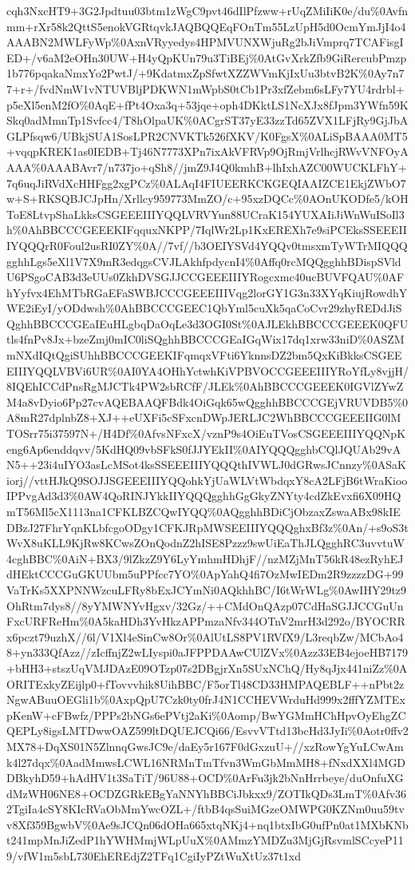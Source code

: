 \documentclass[]{article}
\begin{document}
cqh3NxcHT9+3G2Jpdtuu03btm1zWgC9pvt46dIlPfzww+rUqZMiIiK0e/du\%0Avfnmm+rXr58k2QttS5enokVGRtqvkJAQBQQEqFOnTm55LzUpH5d0OcmYmJjI4o4AAABN2MWLFyWp\%0AxnVRyyedys4HPMVUNXWjuRg2bJiVmprq7TCAFisgIED+/v6aM2eOHn30UW+H4yQpKUn79u3TiBEj\%0AtGvXrkZfb9GiRercubPmzp1b776pqakaNmxYo2PwtJ/+9KdatmxZpSfwtXZZWVmKjIxUu3btvB2K\%0Ay7n77+r+/fvdNmW1vNTUVBljPDKWN1mWpbS0tCb1Pr3xfZebm6sLFy7YU4rdrbl+p5eXl5enM2fO\%0AqE+fPt4Oxa3q+53jqe+oph4DKktLS1NcXJx8fJpm3YWfn59KSkq0adMmnTp1Svfcc4/T8hOlpaUK\%0ACgrST37yE33zzTd65ZVX1LFjRy9GjJbAGLPfsqw6/UBkjSUA1SosLPR2CNVKTk526fXKV/K0FgsX\%0ALiSpBAAA0MT5+vqqpKREK1as0IEDB+Tj46N7773XPn7ixAkVFRVp9OjRmjVrlhcjRWvVNFOyAAAA\%0AAABAvr7/n737jo+qSh8//jmZ9J4Q0kmhB+lhIxhAZC00WUCKLFhY+7q6uqJiRVdXcHHFgg2xgPCz\%0ALAqI4FIUEERKCKGEQIAAIZCE1EkjZWbO7w+S+RKSQBJCJpHn/Xrllcy959773MmZO/c+95xzDQCc\%0AOnUKODfe5/kOHToE8LtvpShaLkksCSGEEEIIIYQQLVRVYun88UCraK154YUXAIiJiWnWuISoIl3h\%0AhBBCCCGEEEKIFqquxNKPP/7IqlWr2Lp1KxEREXh7e9siPCEksSSEEEIIIYQQQrR0Foul2usRI0ZY\%0A//7vf//b3OEIYSVd4YQQv0tmsxmTyWTrMIQQQgghhLgs5eXl1V7X9mR3edqgsCVJLAkhfpdycnI4\%0Affq0rcMQQgghhBDispSVldU6PSgoCAB3d3eUUs0ZkhDVSGJJCCGEEEIIIYRogcxmc40ucBUVFQAU\%0AFhYyfvx4EhMTbRGaEFaSWBJCCCGEEEIIIVqg2lorGY1G3n33XYqKiujRowdhYWE2iEyI/yODdwsh\%0AhBBCCCGEEC1QbYml5cuXk5qaCoCvr29zhyREDdJiSQghhBBCCCGEaIEuHLgbqDaOqLe3d3OGI0St\%0AJLEkhBBCCCGEEEK0QFUtls4fnPv8Jx+bzeZmj0mIC0liSQghhBBCCCGEaIGqWix17dq1xrw33niD\%0ASZMmNXdIQtQgiSUhhBBCCCGEEKIFqmqxVFti6YknnsDZ2bm5QxKiBkksCSGEEEIIIYQQLVBVi6UR\%0AI0YA4OHhYctwhKiVPBVOCCGEEEIIIYRoYfLy8vjjH/8IQEhICCdPnsRgMJCTk4PW2sbRCfF/JLEk\%0AhBBCCCGEEEK0IGVlZYwZM4a8vDyio6Pp27cvAQEBAAQFBdk4OiGqk65wQgghhBBCCCGEjVRUVDB5\%0A8mR27dplnbZ8+XJ++eUXFi5cSFxcnDWpJERLJC2WhBBCCCGEEEIIG0lMTOSrr75i37597N+/H4Df\%0AfvsNFxcX/vznP9s4OiEuTVosCSGEEEIIIYQQNpKeng6Ap6enddqvv/5KdHQ09vbSFkS0fJJYEkII\%0AIYQQQgghbCQlJQUAb29vAN5++23i4uIYO3asLcMSot4ksSSEEEIIIYQQQthIVWLJ0dGRwsJCnnzy\%0ASaKiorj//vttHJkQ9SOJJSGEEEIIIYQQohkYjUaWLVtWbdqxY8cA2LFjB6tWraKiooIPPvgAd3d3\%0AW4QoRINJYkkIIYQQQgghhGgGkyZNYty4cdZkEvxfi6X09HQmT56Ml5cX1113na1CFKLBZCQwIYQQ\%0AQgghhBDiCjObzaxZswaABx98kIEDBzJ27FhrYqnKLbfcgoODgy1CFKJRpMWSEEIIIYQQQghxBf3z\%0An/+s9oS3tWvX8uKLL9KjRw8KCwsZOnQodnZ2hISE8Pzzz9swUiEaThJLQgghRC3uvvtuW4cghBBC\%0AiN+BX3/9lZkzZ9Y6LyYmhmHDhjF//nzMZjMnT56kR48ezRyhEJdHEktCCCGuGKUUbm5uPPfcc7YO\%0ApYahQ4fi7OzMwIEDm2R9zzzzDG+99VaTrKs5XXPNNWzcuLFRy8bExJCYmNi0AQkhhBC/I6tWrWLg\%0AwIHY29tz9OhRtm7dys8//8yYMWNYvHgxv/32Gz/++CMdOnQAzp07CdHaSGJJCCGuUnFxcURFReHm\%0A5kaHDh3YvHkzAPPmzaNfv344OTnV2mrH3d292o/BYOCRRx6pczt79uzhX//6l/V1Xl4eSinCw8Or\%0AlUtLS8PV1RVfX9/L3reqbZw/MCbAo48+yn333QfAzz//zIcffnjZ2wLIyspi0aJFPPDAAwCUlZVx\%0Azz33EB4ejoeHB7179+bHH3+stszUqVMJDAzE09OTzp07s2DBgjrXn5SUxNChQ/Hy8qJjx441niZz\%0AORITExkyZEijlp0+fTovvvhik8UihBBC/F5orTl48CD33HMPAQEBLF++nPbt2zNgwABuuOEGli1b\%0AxpQpU7Czk0ty0frJ4N1CCHEVWrduHd999x2fffYZMTExpKenW+cFBwfz/PPPs2bNGs6ePVtj2aKi\%0Aomp/BwYGMmHChHpvOyEhgZCQEPLy8igsLMTDwwOAZ599ltDQUEJCQi66/EsvvVTtd13bcHd3JyIi\%0Aotr0ffv2MX78+DqXS01N5ZlnnqGwsJC9e/daEy5r167F0dGxzuU+//xzRowYgYuLCwAmk4l27dqx\%0AadMmwsLCWL16NRMnTmTfvn3WmGbMmMH8+fNxdXXl4MGDDBkyhD59+hAdHV1t3SaTiT/96U88+OCD\%0ArFu3jk2bNnHrrbeye/duOnfuXGdMzWH06NE8+OCDZGRkEBgYaNNYhBBCiJbkxx9/ZOTIkQDs3LmT\%0Afv362TgiIa4cSY8KIcRVaObMmYwcOZL+/ftbB4qsSuiMGzeOMWPG0KZNm0uu59tvv8Xf359BgwbV\%0Ae9sJCQn06dOHa665xtqNKj4+nq1btxIbG0ufPn0at1MXbKNbt241mpMnJiZedP1hYWHMmjWLpUuX\%0AMmzYMDZu3MjGjRsvmlSCcyeP119/vfW1m5sbL730EhEREdjZ2TFq1CgiIyPZtWuXtUz37t1xd
\end{document}
